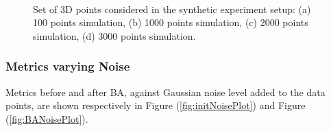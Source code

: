 \begin{figure}[h]
    \centering
    \\ 
    \caption[Synthetic Scene Setup]{Set of 3D points considered in the synthetic experiment setup: (a) 100 points simulation, (b) 1000 points simulation, (c) 2000 points simulation, (d) 3000 points simulation.}
    \label{fig:syntheticScenes}
\end{figure}

\pagebreak

\subsubsection*{Metrics varying Noise}
Metrics before and after \acs{BA}, against Gaussian noise level added to the data points, are shown respectively in Figure (\ref{fig:initNoisePlot}) and Figure (\ref{fig:BANoisePlot}).

